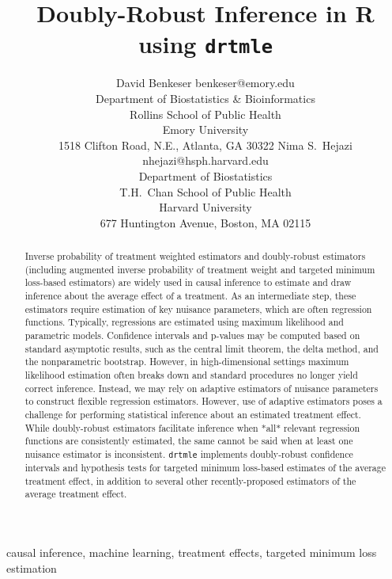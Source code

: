 \documentclass[twoside,11pt]{article}
\begin{document}
\title{Doubly-Robust Inference in R using \texttt{drtmle}}

\author{
  \name David Benkeser \email benkeser@emory.edu \\
  \addr Department of Biostatistics \& Bioinformatics\\
  Rollins School of Public Health\\
  Emory University\\
  1518 Clifton Road, N.E., Atlanta, GA 30322
  \AND
  \name Nima S.~Hejazi \email nhejazi@hsph.harvard.edu \\
  \addr Department of Biostatistics\\
  T.H.~Chan School of Public Health\\
  Harvard University \\
  677 Huntington Avenue, Boston, MA 02115
}

\maketitle

\begin{abstract}
  Inverse probability of treatment weighted estimators and doubly-robust
  estimators (including augmented inverse probability of treatment weight and
  targeted minimum loss-based estimators) are widely used in causal inference to
  estimate and draw inference about the average effect of a treatment. As an
  intermediate step, these estimators require estimation of key nuisance
  parameters, which are often regression functions. Typically, regressions are
  estimated using maximum likelihood and parametric models. Confidence intervals
  and p-values may be computed based on standard asymptotic results, such as the
  central limit theorem, the delta method, and the nonparametric bootstrap.
  However, in high-dimensional settings maximum likelihood estimation often
  breaks down and standard procedures no longer yield correct inference.
  Instead, we may rely on adaptive estimators of nuisance parameters to
  construct flexible regression estimators. However, use of adaptive estimators
  poses a challenge for performing statistical inference about an estimated
  treatment effect. While doubly-robust estimators facilitate inference when
  *all* relevant regression functions are consistently estimated, the same
  cannot be said when at least one nuisance estimator is inconsistent.
  \texttt{drtmle} implements doubly-robust confidence intervals and hypothesis
  tests for targeted minimum loss-based estimates of the average treatment
  effect, in addition to several other recently-proposed estimators of the
  average treatment effect.
\end{abstract}

\begin{keywords}
  causal inference, machine learning, treatment effects, targeted minimum
  loss estimation
\end{keywords}
\end{document}
